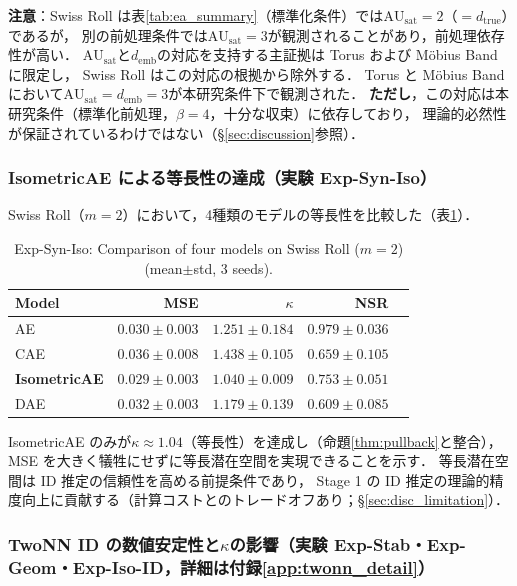 \documentclass[11pt,a4paper]{jsarticle}
\newcommand{\dtrue}{d_{\mathrm{true}}}
\newcommand{\kap}{\kappa}
\newcommand{\AUsat}{\mathrm{AU}_{\mathrm{sat}}}
\newcommand{\demb}{d_{\mathrm{emb}}}
\begin{document}
\textbf{注意}：Swiss Roll は表\ref{tab:ea_summary}（標準化条件）では$\AUsat=2$（$= \dtrue$）であるが，
別の前処理条件では$\AUsat=3$が観測されることがあり，前処理依存性が高い．
$\AUsat$と$\demb$の対応を支持する主証拠は Torus および Möbius Band に限定し，
Swiss Roll はこの対応の根拠から除外する．
Torus と Möbius Band において$\AUsat = \demb = 3$が本研究条件下で観測された．
\textbf{ただし}，この対応は本研究条件（標準化前処理，$\beta = 4$，十分な収束）に依存しており，
理論的必然性が保証されているわけではない（§\ref{sec:discussion}参照）．

\subsubsection{IsometricAE による等長性の達成（実験 Exp-Syn-Iso）}

Swiss Roll（$m = 2$）において，4種類のモデルの等長性を比較した（表\ref{tab:ec}）．

\begin{table}[H]
\centering
\caption{Exp-Syn-Iso: Comparison of four models on Swiss Roll ($m=2$) (mean$\pm$std, 3 seeds).}
\label{tab:ec}
\small
\begin{tabular}{lrrrr}
\toprule
Model & MSE & $\kap$ & NSR \\
\midrule
AE & $0.030\pm0.003$ & $1.251\pm0.184$ & $0.979\pm0.036$ \\
CAE & $0.036\pm0.008$ & $1.438\pm0.105$ & $0.659\pm0.105$ \\
\textbf{IsometricAE} & $\boldsymbol{0.029\pm0.003}$ & $\boldsymbol{1.040\pm0.009}$ & $0.753\pm0.051$ \\
DAE & $0.032\pm0.003$ & $1.179\pm0.139$ & $0.609\pm0.085$ \\
\bottomrule
\end{tabular}
\end{table}

IsometricAE のみが$\kap \approx 1.04$（等長性）を達成し（命題\ref{thm:pullback}と整合），
MSE を大きく犠牲にせずに等長潜在空間を実現できることを示す．
等長潜在空間は ID 推定の信頼性を高める前提条件であり，
Stage 1 の ID 推定の理論的精度向上に貢献する（計算コストとのトレードオフあり；§\ref{sec:disc_limitation}）．

\subsubsection{TwoNN ID の数値安定性と$\kap$の影響（実験 Exp-Stab・Exp-Geom・Exp-Iso-ID，詳細は付録\ref{app:twonn_detail}）}\label{sec:exp_ep}
\end{document}

